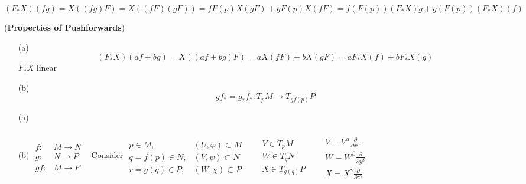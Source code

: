 \[
(F_*X)(fg) = X( (fg) F) = X((fF)(gF) ) = fF(p) X(gF) + gF(p) X(fF) = f(F(p)) (F_*X)g + g(F(p)) (F_*X)(f)
\]

\begin{lemma}[3.5] (\textbf{Properties of Pushforwards})
\begin{enumerate}
  \item[(a)] 
\[
 (F_* X)( af + bg) = X((af + bg) F) = aX(fF) + bX(gF) = aF_*X(f) + bF_*X(g)
\]
$F_*X$ linear
  \item[(b)] 
\[
gf_* = g_* f_*:T_pM \to T_{gf(p)}P
\]  
\end{enumerate}
\end{lemma}

\begin{enumerate}
\item[(a)]
\item[(b)]$\begin{aligned} & \quad \\ 
  f : & M \to N \\
  g : & N \to P \\ 
  gf : & M \to P \end{aligned}$ \quad \, Consider $\begin{aligned} & \quad \\ 
  p \in M , & (U, \varphi) \subset M  \\
  q = f(p) \in N , & (V, \psi) \subset N \\
  r = g(q) \in P , & (W, \chi) \subset P \end{aligned}$ \quad \, $\begin{aligned} & \quad \\ 
  & V \in T_pM \\
  & W \in T_qN \\
  & X \in T_{g(q)}P \end{aligned}$ \quad \, $\begin{aligned} & \quad \\ 
  & V = V^{\alpha} \frac{ \partial }{ \partial x^{\alpha} } \\ 
  & W = W^{\beta} \frac{ \partial }{ \partial y^{\beta} } \\ 
  & X = X^{\gamma} \frac{ \partial }{ \partial z^{\gamma} } \end{aligned}$


\end{enumerate}
